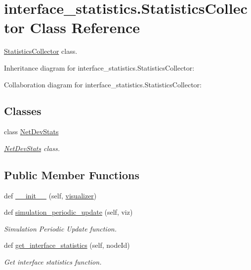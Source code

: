 \hypertarget{classinterface__statistics_1_1StatisticsCollector}{}\section{interface\+\_\+statistics.\+Statistics\+Collector Class Reference}
\label{classinterface__statistics_1_1StatisticsCollector}


\hyperlink{classinterface__statistics_1_1StatisticsCollector}{Statistics\+Collector} class.  




Inheritance diagram for interface\+\_\+statistics.\+Statistics\+Collector\+:


Collaboration diagram for interface\+\_\+statistics.\+Statistics\+Collector\+:
\subsection*{Classes}
\begin{DoxyCompactItemize}
\item 
class \hyperlink{classinterface__statistics_1_1StatisticsCollector_1_1NetDevStats}{Net\+Dev\+Stats}
\begin{DoxyCompactList}\small\item\em \hyperlink{classinterface__statistics_1_1StatisticsCollector_1_1NetDevStats}{Net\+Dev\+Stats} class. \end{DoxyCompactList}\end{DoxyCompactItemize}
\subsection*{Public Member Functions}
\begin{DoxyCompactItemize}
\item 
def \hyperlink{classinterface__statistics_1_1StatisticsCollector_a9a84fd18165ac48be4054839017d4726}{\+\_\+\+\_\+init\+\_\+\+\_\+} (self, \hyperlink{classinterface__statistics_1_1StatisticsCollector_af7c6f75e1186b946219df43583461f2d}{visualizer})
\item 
def \hyperlink{classinterface__statistics_1_1StatisticsCollector_acb595e8b2e4d80ad10e4cc3d335a4828}{simulation\+\_\+periodic\+\_\+update} (self, viz)
\begin{DoxyCompactList}\small\item\em Simulation Periodic Update function. \end{DoxyCompactList}\item 
def \hyperlink{classinterface__statistics_1_1StatisticsCollector_a018f174d867b4e4b58622f40e875f351}{get\+\_\+interface\+\_\+statistics} (self, node\+Id)
\begin{DoxyCompactList}\small\item\em Get interface statistics function. \end{DoxyCompactList}\end{DoxyCompactItemize}
